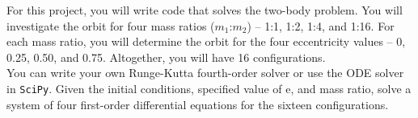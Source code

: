 \documentclass{article}
\begin{document}
\noindent For this project, you will write code that solves the two-body problem. You will investigate the orbit for four mass ratios ($m_1$:$m_2$) -- 1:1, 1:2, 1:4, and 1:16. For each mass ratio, you will determine the orbit for the four eccentricity values -- 0, 0.25, 0.50, and 0.75. Altogether, you will have 16 configurations.\\

\noindent You can write your own Runge-Kutta fourth-order solver or use the ODE solver in \texttt{SciPy}. Given the initial conditions, specified value of e, and mass ratio, solve a system of four first-order differential equations for the sixteen configurations.
\end{document}
